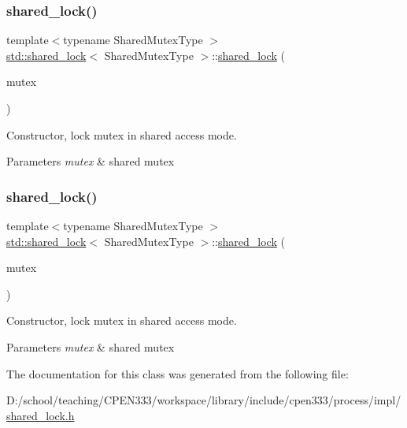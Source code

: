 \subsubsection{\texorpdfstring{shared\+\_\+lock()}{shared\_lock()}\hspace{0.1cm}{\footnotesize\ttfamily [1/2]}}
{\footnotesize\ttfamily template$<$typename Shared\+Mutex\+Type $>$ \\
\hyperlink{classstd_1_1shared__lock}{std\+::shared\+\_\+lock}$<$ Shared\+Mutex\+Type $>$\+::\hyperlink{classstd_1_1shared__lock}{shared\+\_\+lock} (\begin{DoxyParamCaption}\item[{Shared\+Mutex\+Type \&}]{mutex }\end{DoxyParamCaption})\hspace{0.3cm}{\ttfamily [inline]}}



Constructor, lock mutex in shared access mode. 


\begin{DoxyParams}{Parameters}
{\em mutex} & shared mutex \\
\hline
\end{DoxyParams}
\mbox{\label{classstd_1_1shared__lock_ad98172785abb3cf717e758dfe033798e}} 
\subsubsection{\texorpdfstring{shared\+\_\+lock()}{shared\_lock()}\hspace{0.1cm}{\footnotesize\ttfamily [2/2]}}
{\footnotesize\ttfamily template$<$typename Shared\+Mutex\+Type $>$ \\
\hyperlink{classstd_1_1shared__lock}{std\+::shared\+\_\+lock}$<$ Shared\+Mutex\+Type $>$\+::\hyperlink{classstd_1_1shared__lock}{shared\+\_\+lock} (\begin{DoxyParamCaption}\item[{Shared\+Mutex\+Type \&}]{mutex }\end{DoxyParamCaption})\hspace{0.3cm}{\ttfamily [inline]}}



Constructor, lock mutex in shared access mode. 


\begin{DoxyParams}{Parameters}
{\em mutex} & shared mutex \\
\hline
\end{DoxyParams}


The documentation for this class was generated from the following file\+:\begin{DoxyCompactItemize}
\item 
D\+:/school/teaching/\+C\+P\+E\+N333/workspace/library/include/cpen333/process/impl/\hyperlink{process_2impl_2shared__lock_8h}{shared\+\_\+lock.\+h}\end{DoxyCompactItemize}
